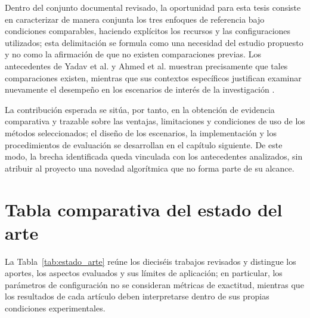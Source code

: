 Dentro del conjunto documental revisado, la oportunidad para esta tesis consiste en caracterizar de manera conjunta los tres enfoques de referencia bajo condiciones comparables, haciendo explícitos los recursos y las configuraciones utilizados; esta delimitación se formula como una necesidad del estudio propuesto y no como la afirmación de que no existen comparaciones previas. Los antecedentes de Yadav et al. y Ahmed et al. muestran precisamente que tales comparaciones existen, mientras que sus contextos específicos justifican examinar nuevamente el desempeño en los escenarios de interés de la investigación \cite{yadav2020performance,ahmed2023overview}.

La contribución esperada se sitúa, por tanto, en la obtención de evidencia comparativa y trazable sobre las ventajas, limitaciones y condiciones de uso de los métodos seleccionados; el diseño de los escenarios, la implementación y los procedimientos de evaluación se desarrollan en el capítulo siguiente. De este modo, la brecha identificada queda vinculada con los antecedentes analizados, sin atribuir al proyecto una novedad algorítmica que no forma parte de su alcance.

\section{Tabla comparativa del estado del arte}
\label{sec:tabla_estado_arte}

La Tabla~\ref{tab:estado_arte} reúne los dieciséis trabajos revisados y distingue los aportes, los aspectos evaluados y sus límites de aplicación; en particular, los parámetros de configuración no se consideran métricas de exactitud, mientras que los resultados de cada artículo deben interpretarse dentro de sus propias condiciones experimentales.

